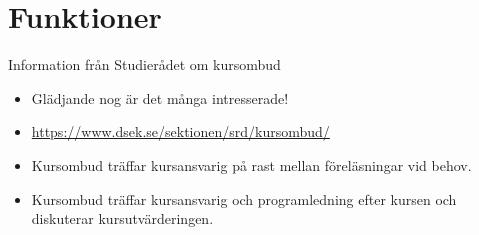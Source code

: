 \documentclass{lecturenotes}
\renewcommand{\vecka}{3}
\newcommand{\veckotema}{Funktioner}
\begin{document}
\frame{\titlepage}
\setnextsection{\vecka}
\section[Vecka \vecka: \veckotema]{\veckotema}
\frame{\tableofcontents}



\begin{Slide}{Information från Studierådet om kursombud}
\begin{itemize}
\item Glädjande nog är det många intresserade!
\item \url{https://www.dsek.se/sektionen/srd/kursombud/}
\item Kursombud träffar kursansvarig på rast mellan föreläsningar vid behov.
\item Kursombud träffar kursansvarig och programledning efter kursen och diskuterar kursutvärderingen.
\end{itemize}
\end{Slide}
\end{document}
